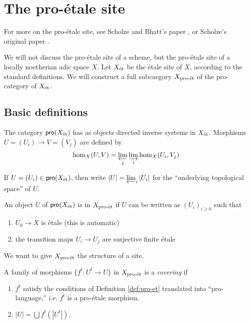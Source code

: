 
\section{The pro-\'etale site}





For more on the pro-\'etale site, see Scholze and Bhatt's paper 
\cite{bs13}, or Scholze's original paper \cite{sc13}. 

We will not discuss the pro-\'etale site of a scheme, but the pro-\'etale site 
of a locally noetherian adic space $X$. Let $X_{\textnormal{\'et}}$ be the \'etale site of $X$, 
according to the standard definitions. We will construct a full subcaegory 
$X_{\textnormal{pro-\'et}}$ of the pro-category of $X_{\textnormal{\'et}}$. 





\subsection{Basic definitions}

\begin{definition}
The category $\mathsf{pro}(X_{\textnormal{\'et}})$ has as objects directed inverse systems 
in $X_{\textnormal{\'et}}$. Morphisms $U=(U_i) \to V=(V_j)$ are defined by 
\[
  \hom_X(U,V) = \varprojlim_j \varinjlim_i \hom_X(U_i,V_j)
\]
\end{definition}

If $U=(U_i)\in \mathsf{pro}(X_{\textnormal{\'et}})$, then write $|U|=\varprojlim_i |U_i|$ for 
the ``underlying topological space'' of $U$. 

\begin{definition}\label{def:pro-et}
An object $U$ of $\mathsf{pro}(X_{\textnormal{\'et}})$ is in $X_{\textnormal{pro-\'et}}$ if $U$ can be written 
as $(U_i)_{i\geqslant 0}$ such that 
\begin{enumerate}
  \item $U_0 \to X$ is \'etale (this is automatic)
  \item the transition maps $U_i \to U_j$ are surjective finite \'etale
\end{enumerate}
\end{definition}

We want to give $X_{\textnormal{pro-\'et}}$ the structure of a site. 

\begin{definition}
A family of morphisms $\{f^t:U^t\to U\}$ in $X_{\textnormal{pro-\'et}}$ is a \emph{covering} if 
\begin{enumerate}
  \item $f^t$ satisfy the conditions of Definition \ref{def:pro-et} translated 
    into ``pro-language,'' i.e. $f^t$ is a pro-\'etale morphism. 
  \item $|U|=\bigcup f^t(|U^t|)$. 
\end{enumerate}
\end{definition}

